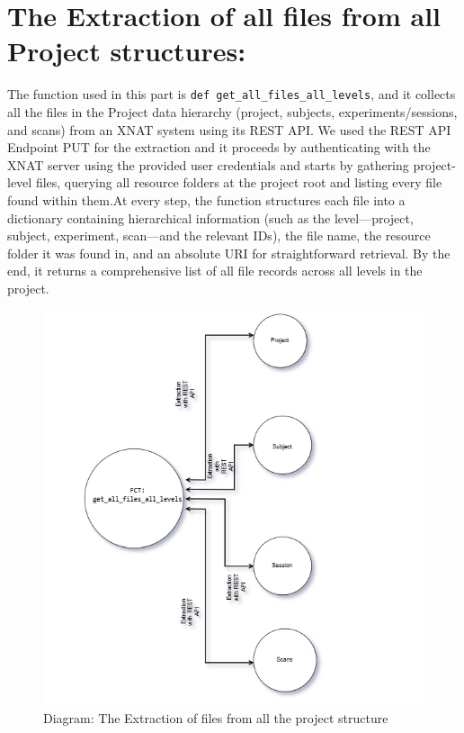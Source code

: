 \section{The Extraction of all files from all Project structures:}
The function used in this part is \texttt{def get\_all\_files\_all\_levels}, and it collects all the files in the Project data hierarchy (project, subjects, experiments/sessions, and scans) from an XNAT system using its REST API. We used the REST API Endpoint PUT for the extraction and it proceeds by authenticating with the XNAT server using the provided user credentials and starts by gathering project-level files, querying all resource folders at the project root and listing every file found within them.At every step, the function structures each file into a dictionary containing hierarchical information (such as the level—project, subject, experiment, scan—and the relevant IDs), the file name, the resource folder it was found in, and an absolute URI for straightforward retrieval. By the end, it returns a comprehensive list of all file records across all levels in the project. \\

\begin{figure}
    \centering
    \includegraphics[width=0.6\linewidth]{en/content/edf.png}
    \caption{Diagram: The Extraction of files from all the project structure}
    \label{fig:enter-label}
\end{figure}


\\

